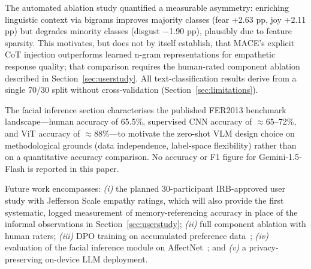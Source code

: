 \documentclass[conference]{IEEEtran}
\begin{document}
The automated ablation study quantified a measurable asymmetry:
enriching linguistic context via bigrams improves majority
classes (fear +2.63 pp, joy +2.11 pp) but degrades minority
classes (disgust $-$1.90 pp), plausibly due to feature sparsity.
This motivates, but does not by itself establish, that MACE's
explicit CoT injection outperforms learned n-gram representations
for empathetic response quality; that comparison requires the
human-rated component ablation described in
Section~\ref{sec:userstudy}.
All text-classification results derive from a single 70/30 split
without cross-validation (Section~\ref{sec:limitations}).

The facial inference section characterises the published FER2013
benchmark landscape---human accuracy of 65.5\%, supervised
CNN accuracy of $\approx$65--72\%, and ViT accuracy of
$\approx$88\%---to motivate the zero-shot VLM design choice on
methodological grounds (data independence, label-space
flexibility) rather than on a quantitative accuracy comparison.
No accuracy or F1 figure for Gemini-1.5-Flash is reported in this
paper.

Future work encompasses: \textit{(i)} the planned 30-participant
IRB-approved user study with Jefferson Scale empathy ratings,
which will also provide the first systematic, logged measurement
of memory-referencing accuracy in place of the informal
observations in Section~\ref{sec:userstudy};
\textit{(ii)} full component ablation with human raters;
\textit{(iii)} DPO training on accumulated preference
data~\cite{rafailov2023dpo};
\textit{(iv)} evaluation of the facial inference module on
AffectNet~\cite{mollahosseini2019affectnet}; and
\textit{(v)} a privacy-preserving on-device LLM deployment.
\end{document}
